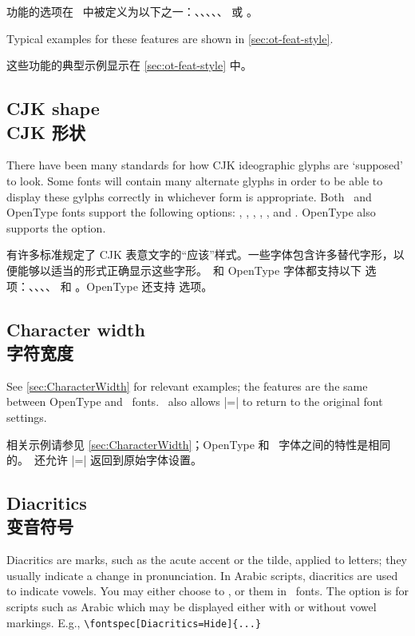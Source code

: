 \documentclass[a4paper]{l3doc}
\begin{document}
 功能的选项在 \AAT\ 中被定义为以下之一：、、、、、 或 。

Typical examples for these features are shown in \ref{sec:ot-feat-style}.

这些功能的典型示例显示在 \ref{sec:ot-feat-style} 中。

\subsection{CJK shape\\CJK 形状}
There have been many standards for how CJK ideographic
glyphs are `supposed' to look. Some fonts will contain many alternate
glyphs in order to be able to display these gylphs
correctly in whichever form is appropriate. Both \AAT\ and OpenType
fonts support the following  options:
, , , ,
, and . OpenType also supports the  option.

有许多标准规定了 CJK 表意文字的“应该”样式。一些字体包含许多替代字形，以便能够以适当的形式正确显示这些字形。\AAT\ 和 OpenType 字体都支持以下  选项：、、、、 和 。OpenType 还支持  选项。
\subsection{Character width\\字符宽度}
See \vref{sec:CharacterWidth} for relevant examples; the features are
the same between OpenType and \AAT\ fonts.
\AAT\ also allows |=| to return to
the original font settings.

相关示例请参见 \vref{sec:CharacterWidth}；OpenType 和 \AAT\ 字体之间的特性是相同的。\AAT\ 还允许 |=| 返回到原始字体设置。

\subsection{Diacritics\\变音符号}
Diacritics are marks, such as the acute accent or the tilde, applied to letters; they usually indicate a change in pronunciation.
In Arabic scripts, diacritics are used to indicate vowels.
You may either choose
to ,  or  them in \AAT\ fonts.
The  option is for scripts such as Arabic which may be
displayed either with or without vowel markings. E.g.,
\verb|\fontspec[Diacritics=Hide]{...}|
\end{document}
